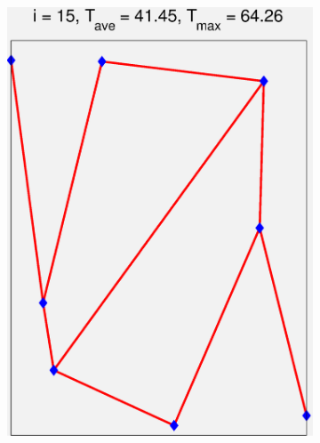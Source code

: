 \documentclass[11pt,letterpaper]{article}
\begin{document}
\begin{figure}[!h]
\begin{subfigure}{0.2\textwidth}
\includegraphics[width=\linewidth]{parallelTwo_Pmax30k_channel_15.eps}
\caption{}
\end{subfigure}
\begin{subfigure}{0.2\textwidth}

\end{subfigure}
\end{figure}
\end{document}
